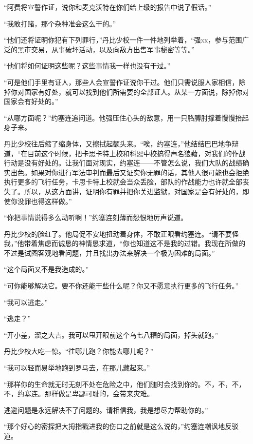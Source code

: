     “阿费将宣誓作证，说你和麦克沃特在你们给上级的报告中说了假话。”

    “我敢打赌，那个杂种准会这么干的。”

    “他们还将证明你犯有下列罪行，”丹比少校一件一件地列举着，“强xx，参与范围广泛的黑市交易，从事破坏活动，以及向敌方出售军事秘密等等。”

    “他们将如何证明这些呢？这些事情我一样也没有干过。”

    “可是他们手里有证人，那些人会宣誓作证说你干过。他们只需说服人家相信，除掉你对国家有好处，就可以找到他们所需要的全部证人。从某一方面说，除掉你对国家会有好处的。”

    “从哪方面呢？”约塞连追问道。他强压住心头的敌意，用一只胳膊肘撑着慢慢抬起身子来。

    丹比少校往后缩了缩身体，又擦拭起额头来。“唉，约塞连，”他结结巴巴地争辩道，“在目前这个时候，把卡思卡特上校和科恩中校搞得声名狼藉，对我们的作战行动是没有好处的。让我们面对现实，约塞连——不管怎么说，我们大队的战绩确实出色。如果对你进行军法审判而最后又证实你无罪的话，其他人很可能也会拒绝执行更多的飞行任务，卡思卡特上校就会当众丢脸，部队的作战能力也许就全部丧失了。所以，从这方面讲，证明你有罪并把你关进监狱，对国家是会有好处的，即使你没罪也得这样做。”

    “你把事情说得多么动听啊！”约塞连刻薄而怨恨地厉声说道。

    丹比少校的脸红了。他局促不安地扭动着身体，不敢正眼看约塞连。“请不要怪我，”他带着焦虑而诚恳的神情恳求道，“你也知道这不是我的过错。我现在所做的不过是试图客观地看问题，并且找出办法来解决一个极为困难的局面。”

    “这个局面又不是我造成的。”

    “可你能够解决它。要不你还能干些什么呢？你又不愿意执行更多的飞行任务。”

    “我可以逃走。”

    “逃走？”

    “开小差，溜之大吉。我可以甩开眼前这个乌七八糟的局面，掉头就跑。”

    丹比少校大吃一惊。“往哪儿跑？你能去哪儿呢？”

    “我可以轻而易举地跑到罗马去，在那儿藏起来。”

    “那样你的生命就无时无刻不处在危险之中，他们随时会找到你的。不，不，不，不，约塞连。那样做是卑鄙可耻的，会带来灾难。

    逃避问题是永远解决不了问题的。请相信我，我是想尽力帮助你的。”

    “那个好心的密探把大拇指戳进我的伤口之前就是这么说的，”约塞连嘲讽地反驳道。

